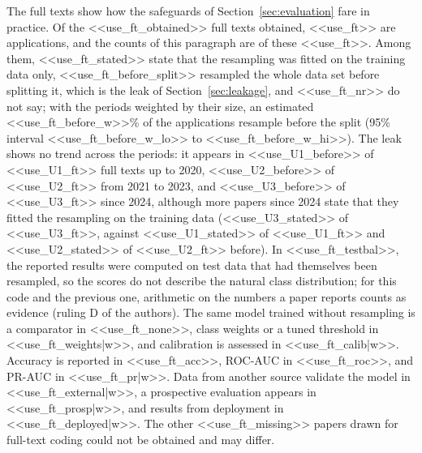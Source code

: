 The full texts show how the safeguards of Section~\ref{sec:evaluation} fare in practice. Of the <<use_ft_obtained>> full texts obtained, <<use_ft>> are applications, and the counts of this paragraph are of these <<use_ft>>. Among them, <<use_ft_stated>> state that the resampling was fitted on the training data only, <<use_ft_before_split>> resampled the whole data set before splitting it, which is the leak of Section~\ref{sec:leakage}, and <<use_ft_nr>> do not say; with the periods weighted by their size, an estimated <<use_ft_before_w>>\% of the applications resample before the split (95\% interval <<use_ft_before_w_lo>> to <<use_ft_before_w_hi>>). The leak shows no trend across the periods: it appears in <<use_U1_before>> of <<use_U1_ft>> full texts up to 2020, <<use_U2_before>> of <<use_U2_ft>> from 2021 to 2023, and <<use_U3_before>> of <<use_U3_ft>> since 2024, although more papers since 2024 state that they fitted the resampling on the training data (<<use_U3_stated>> of <<use_U3_ft>>, against <<use_U1_stated>> of <<use_U1_ft>> and <<use_U2_stated>> of <<use_U2_ft>> before). In <<use_ft_testbal>>, the reported results were computed on test data that had themselves been resampled, so the scores do not describe the natural class distribution; for this code and the previous one, arithmetic on the numbers a paper reports counts as evidence (ruling D of the authors). The same model trained without resampling is a comparator in <<use_ft_none>>, class weights or a tuned threshold in <<use_ft_weights|w>>, and calibration is assessed in <<use_ft_calib|w>>. Accuracy is reported in <<use_ft_acc>>, ROC-AUC in <<use_ft_roc>>, and PR-AUC in <<use_ft_pr|w>>. Data from another source validate the model in <<use_ft_external|w>>, a prospective evaluation appears in <<use_ft_prosp|w>>, and results from deployment in <<use_ft_deployed|w>>. The other <<use_ft_missing>> papers drawn for full-text coding could not be obtained and may differ.

